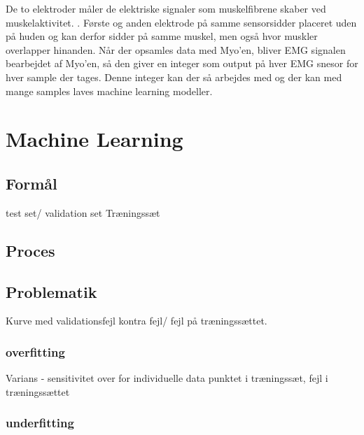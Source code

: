 De to elektroder måler de elektriske signaler som muskelfibrene skaber ved muskelaktivitet.
\citep{RefWorks:13}. Første og anden elektrode på samme sensorsidder placeret uden på huden og kan derfor sidder på samme muskel, men også hvor muskler overlapper hinanden. Når der opsamles data med Myo'en, bliver EMG signalen bearbejdet af Myo'en, så den giver en integer som output på hver EMG snesor for hver sample der tages. Denne integer kan der så arbejdes med og der kan med mange samples laves machine learning modeller.

\section{Machine Learning}
\label{sec:machineLearning}

\subsection{Formål}

test set/ validation set
Træningssæt 

\subsection{Proces}
\subsection{Problematik}

Kurve med validationsfejl kontra fejl/ fejl på træningssættet. 

\subsubsection{overfitting}
Varians - sensitivitet over for individuelle data punktet i træningssæt, fejl i træningssættet
\subsubsection{underfitting}
